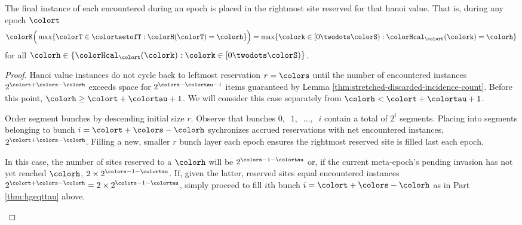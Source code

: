 \begin{lemma}
\label{thm:tilted-last-touched}
The final instance of each \hv{} encountered during an epoch is placed in the rightmost site reserved for that hanoi value.
That is, during any epoch $\colort$
\begin{align*}
\colorK\Big(
  \max\{\colorT \in \colortsetofT : \colorH(\colorT) = \colorh\}
\Big)
=
\max\{\colork \in [0\twodots\colorS) : \colorHcal_{\colort}(\colork) = \colorh \}
\end{align*}
for all $\colorh \in \{\colorHcal_{\colort}(\colork) : \colork \in [0\twodots\colorS)\}$.
\end{lemma}

\begin{proof}
Hanoi value instances do not cycle back to leftmost reservation $r=\colors$ until the number of encountered \hv{} instances $2^{\colort + \colors - \colorh}$ exceeds space for $2^{\colors - \colortau - 1}$ items guaranteed by Lemma \ref{thm:stretched-discarded-incidence-count}.
Before this point, $\colorh \geq \colort + \colortau + 1$.
We will consider this case separately from $\colorh < \colort + \colortau + 1$.

\begin{proofpart}
\label{thm:hgeqttau}
Order segment bunches by descending initial size $r$.
Observe that bunches $0,\;\;1,\;\;\ldots,\;\;i$ contain a total of $2^i$ segments.
Placing into segments belonging to bunch $i = \colort + \colors - \colorh$ sychronizes accrued reservations with net encountered \hv{} instances, $2^{\colort + \colors - \colorh}$.
Filling a new, smaller $r$ bunch layer each epoch ensures the rightmost reserved site is filled last each epoch.
\end{proofpart}

\begin{proofpart}
In this case, the number of sites reserved to a \hv{} $\colorh$ will be $2^{\colors - 1 - \colortau}$ or, if the current meta-epoch's pending invasion has not yet reached \hv{} $\colorh$, $2 \times 2^{\colors - 1 - \colortau}$.
If, given the latter, reserved sites equal encountered \hv{} instances $2^{\colort + \colors - \colorh} = 2 \times 2^{\colors - 1 - \colortau}$, simply proceed to fill $i$th bunch $i=\colort + \colors - \colorh$ as in Part \ref{thm:hgeqttau} above.


\end{proofpart}
\end{proof}
